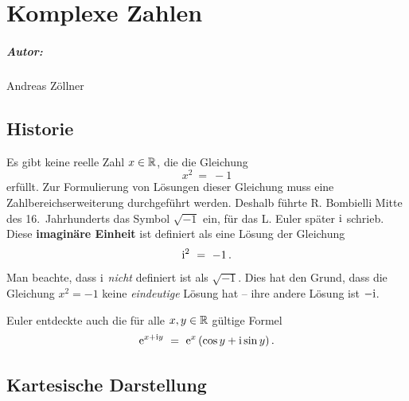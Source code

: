 
\chapter{Komplexe Zahlen}\label{chap:complex}

\paragraph*{Autor:} Andreas Zöllner

\section{Historie}

Es gibt keine reelle Zahl $x\in\mathbb{R}$, die die Gleichung
\[
x^2
\ =\ -1
\]
erfüllt. Zur Formulierung von Lösungen dieser Gleichung muss eine
Zahlbereichserweiterung durchgeführt werden. Deshalb führte R. Bombielli Mitte
des 16.~Jahrhunderts das Symbol $\sqrt{-1}$ ein, für das L. Euler später
$\mathrm{i}$ schrieb. Diese \textbf{imaginäre Einheit} ist definiert als eine
Lösung der Gleichung
\[
\mathrm{i}^2
\ =\ -1
\,.
\]
{%
Man beachte, dass $\mathrm{i}$ \emph{nicht} definiert ist als $\sqrt{-1}$. Dies hat
den Grund, dass die Gleichung $x^2=-1$ keine \emph{eindeutige} Lösung hat --
ihre andere Lösung ist $-\mathrm{i}$.
}

\noindent Euler entdeckte auch die für alle $x,y\in\mathbb{R}$ gültige Formel
\begin{equation}
\label{eq:EulerscheFormel}
\mathrm{e}^{x+\mathrm{i} y}
\ =\ \mathrm{e}^x\,(\cos y + \mathrm{i} \sin y)
\,.
\end{equation}

\section{Kartesische Darstellung}

